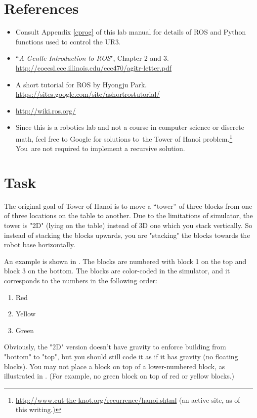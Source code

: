 \section{References}
\begin{itemize}
\item Consult Appendix \ref{cprog} of this lab manual for details of ROS and Python functions used to control the UR3.
\item ``\textit{A Gentle Introduction to ROS}", Chapter 2 and 3. \url{http://coecsl.ece.illinois.edu/ece470/agitr-letter.pdf}
\item A short tutorial for ROS by Hyongju Park. \url{https://sites.google.com/site/ashortrostutorial/}
\item \url{http://wiki.ros.org/}
\item Since this is a robotics lab and not a course in computer science or discrete math, feel free to Google for solutions to\
the Tower of Hanoi problem.\footnote{\url{http://www.cut-the-knot.org/recurrence/hanoi.shtml} (an active site, as of this writing.)} You\
are not required to implement a recursive solution.

\end{itemize}

\newpage
\section{Task}
The original goal of Tower of Hanoi is to move a ``tower'' of three blocks from one of three locations on the table to another. Due to the limitations of simulator, the tower is "2D" (lying on the table) instead of 3D one which you stack vertically. So instead of stacking the blocks upwards, you are "stacking" the blocks towards the robot base horizontally. 

An example is shown in \figref{towers}.  The blocks are numbered with block 1 on the top and block 3 on the bottom. The blocks are color-coded in the simulator, and it corresponds to the numbers in the following order:

\begin{enumerate}
    \item Red
    \item Yellow
    \item Green
\end{enumerate}

Obviously, the "2D" version doesn't have gravity to enforce building from "bottom" to "top", but you should still code it as if it has gravity (no floating blocks). You may not place a block on top of a lower-numbered block, as illustrated in . (For example, no green block on top of red or yellow blocks.)

